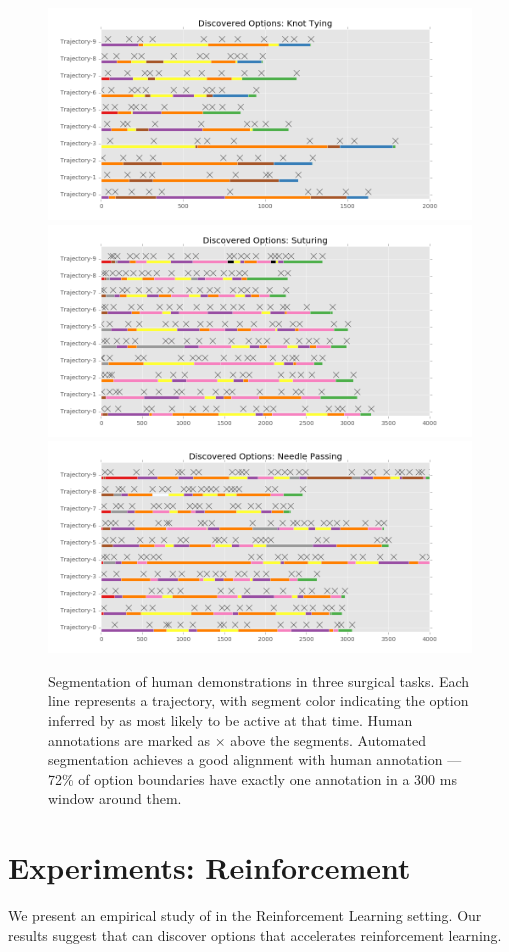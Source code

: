\begin{figure}[ht!]
    \centering
    \includegraphics[width=0.7\columnwidth]{ddco-experiments/options-knot-tying.png}
    \includegraphics[width=0.7\columnwidth]{ddco-experiments/options-suturing.png}
    \includegraphics[width=0.7\columnwidth]{ddco-experiments/options-needle-passing.png}
    \caption{Segmentation of human demonstrations in three surgical tasks. Each line represents a trajectory, with segment color indicating the option inferred by \alg as most likely to be active at that time. Human annotations are marked as $\times$ above the segments. Automated segmentation achieves a good alignment with human annotation --- 72\% of option boundaries have exactly one annotation in a 300 ms window around them. \label{surgery-1}}
\end{figure}

\section{Experiments: Reinforcement}
We present an empirical study of \alg in the Reinforcement Learning setting. Our results suggest that \alg can discover options that accelerates reinforcement learning.

